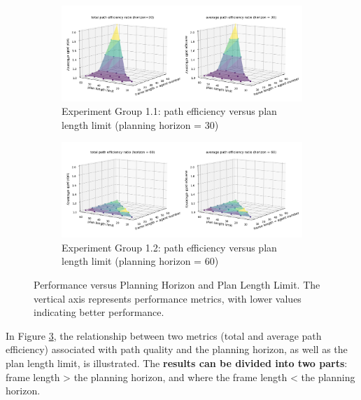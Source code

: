 

\begin{figure}[htbp]
    \centering
    \begin{subfigure}[t]{1.1\linewidth}
      \centering
      \includegraphics[width = \linewidth]{figures/horizon30_plan_length_limit_vs_performance.png}
      \caption{Experiment Group 1.1: path efficiency versus plan length limit (planning horizon = 30)}
      \label{fig:horizon=30,performance/planlengthlimit}
    \end{subfigure}
    \begin{subfigure}[t]{1.1\linewidth}
        \centering
        \includegraphics[width = \linewidth]{figures/horizon60_plan_length_limit_vs_performance.png}
        \caption{Experiment Group 1.2: path efficiency versus plan length limit (planning horizon = 60)}
        \label{fig:horizon=60,performance/planlengthlimit}
      \end{subfigure}
    \caption{Performance versus Planning Horizon and Plan Length Limit. The vertical axis represents performance metrics, with lower values indicating better performance.}
    \label{fig:plan_length_limit}
\end{figure}

\FloatBarrier

In Figure \ref{fig:plan_length_limit}, the relationship between two metrics (total and average path efficiency) associated with path quality and the planning horizon, as well as the plan length limit, is illustrated.
The \textbf{results can be divided into two parts}: frame length > the planning horizon, and where the frame length < the planning horizon.

